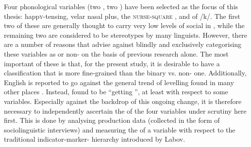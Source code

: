 Four phonological variables (two , two ) have been selected as the focus of this thesis: happ\textsc{y}-tensing, velar nasal plus, the \textsc{nurse}-\textsc{square} , and  of /k/.
The first two of these are generally thought to carry very low levels of social  in , while the remaining two are considered to be stereotypes by many linguists.
However, there are a number of reasons that advise against blindly and exclusively categorising these variables as  or non- on the basis of previous research alone.
The most important of these is that, for the present study, it is desirable to have a classification that is more fine-grained than the binary  vs. non- one.
Additionally,  English is reported to go against the general trend of  levelling found in many other places \parencite{kerswill2003}.
Instead, \textcite[237]{watson2007a} found  to be ``getting '', at least with respect to some variables.
Especially against the backdrop of this ongoing change, it is therefore necessary to independently ascertain the  of the four variables under scrutiny here first.
This is done by analysing production data (collected in the form of sociolinguistic interviews) and measuring the  of a variable with respect to the traditional indicator-marker- hierarchy introduced by Labov.

